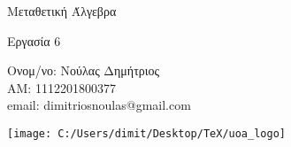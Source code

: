 \documentclass[oneside,a4paper]{article}
\newcommand {\tl}{\textlatin}
\begin{document}
	
	
	\begin{framed}	
		\begin{center}
			\huge Μεταθετική Άλγεβρα
		\end{center}
		\begin{center}
			\huge Εργασία 6
		\end{center}
		\vspace{0.3truecm}
		\begin{center}
			Ονομ/νο: Νούλας Δημήτριος\\
			ΑΜ: 1112201800377\\
			\tl{email}: \tl{dimitriosnoulas@gmail.com}
		\end{center}
		\vspace{0.3truecm}
	\end{framed}
	\vspace*{\fill}
	\begin{center}
	\texttt{[image: C:/Users/dimit/Desktop/TeX/uoa\_logo]}
	\end{center}
\vspace{1cm}
\pagebreak
\end{document}
